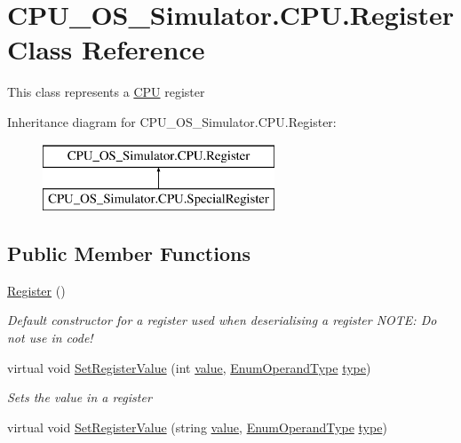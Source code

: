 \hypertarget{class_c_p_u___o_s___simulator_1_1_c_p_u_1_1_register}{}\section{C\+P\+U\+\_\+\+O\+S\+\_\+\+Simulator.\+C\+P\+U.\+Register Class Reference}
\label{class_c_p_u___o_s___simulator_1_1_c_p_u_1_1_register}


This class represents a \hyperlink{namespace_c_p_u___o_s___simulator_1_1_c_p_u}{C\+P\+U} register  


Inheritance diagram for C\+P\+U\+\_\+\+O\+S\+\_\+\+Simulator.\+C\+P\+U.\+Register\+:\begin{figure}[H]
\begin{center}
\leavevmode
\includegraphics[height=2.000000cm]{class_c_p_u___o_s___simulator_1_1_c_p_u_1_1_register}
\end{center}
\end{figure}
\subsection*{Public Member Functions}
\begin{DoxyCompactItemize}
\item 
\hyperlink{class_c_p_u___o_s___simulator_1_1_c_p_u_1_1_register_a1ee1fb682bf9349209b31a50aff2de45}{Register} ()
\begin{DoxyCompactList}\small\item\em Default constructor for a register used when deserialising a register N\+O\+T\+E\+: Do not use in code! \end{DoxyCompactList}\item 
virtual void \hyperlink{class_c_p_u___o_s___simulator_1_1_c_p_u_1_1_register_a7e2bd04b0bbc9eb50ac5f9ee77280fac}{Set\+Register\+Value} (int \hyperlink{class_c_p_u___o_s___simulator_1_1_c_p_u_1_1_register_af2a05af808a3e2fa5fb086844cab1c2d}{value}, \hyperlink{namespace_c_p_u___o_s___simulator_1_1_c_p_u_ad49cfe442b74115a326c03b7ae848f76}{Enum\+Operand\+Type} \hyperlink{class_c_p_u___o_s___simulator_1_1_c_p_u_1_1_register_acb2f0f96db7cdee5c175562a5f050d83}{type})
\begin{DoxyCompactList}\small\item\em Sets the value in a register \end{DoxyCompactList}\item 
virtual void \hyperlink{class_c_p_u___o_s___simulator_1_1_c_p_u_1_1_register_a4460cce5927499b1dd55d05a27cd1eac}{Set\+Register\+Value} (string \hyperlink{class_c_p_u___o_s___simulator_1_1_c_p_u_1_1_register_af2a05af808a3e2fa5fb086844cab1c2d}{value}, \hyperlink{namespace_c_p_u___o_s___simulator_1_1_c_p_u_ad49cfe442b74115a326c03b7ae848f76}{Enum\+Operand\+Type} \hyperlink{class_c_p_u___o_s___simulator_1_1_c_p_u_1_1_register_acb2f0f96db7cdee5c175562a5f050d83}{type})
\end{DoxyCompactItemize}
